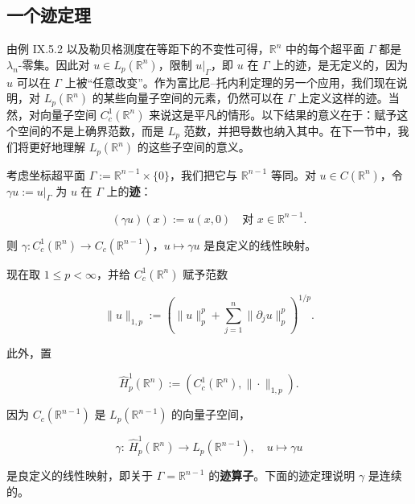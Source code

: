 \subsection*{一个迹定理}

由例 IX.5.2 以及勒贝格测度在等距下的不变性可得，$ \mathbb{R}^{n} $ 中的每个超平面 $ \Gamma $ 都是 $ \lambda_{n} $-零集。因此对 $ u \in L_{p}(\mathbb{R}^{n}) $，限制 $ u|_{\Gamma} $，即 $ u $ 在 $ \Gamma $ 上的迹，是无定义的，因为 $ u $ 可以在 $ \Gamma $ 上被“任意改变”。作为富比尼–托内利定理的另一个应用，我们现在说明，对 $ L_{p}(\mathbb{R}^{n}) $ 的某些向量子空间的元素，仍然可以在 $ \Gamma $ 上定义这样的迹。当然，对向量子空间 $ C_{c}^{1}(\mathbb{R}^{n}) $ 来说这是平凡的情形。以下结果的意义在于：赋予这个空间的不是上确界范数，而是 $ L_{p} $ 范数，并把导数也纳入其中。在下一节中，我们将更好地理解 $ L_{p}(\mathbb{R}^{n}) $ 的这些子空间的意义。

考虑坐标超平面 $ \Gamma := \mathbb{R}^{n-1} \times \{0\} $，我们把它与 $ \mathbb{R}^{n-1} $ 等同。对 $ u \in C(\mathbb{R}^{n}) $，令 $ \gamma u := u|_{\Gamma} $ 为 $ u $ 在 $ \Gamma $ 上的\textbf{迹}：

\[
(\gamma u)(x) := u(x,0) \quad \text{对 } x \in \mathbb{R}^{n-1} .
\]

则 $ \gamma: C_{c}^{1}(\mathbb{R}^{n}) \to C_{c}(\mathbb{R}^{n-1}) $，$ u \mapsto \gamma u $ 是良定义的线性映射。

现在取 $ 1 \le p < \infty $，并给 $ C_{c}^{1}(\mathbb{R}^{n}) $ 赋予范数

\[
\|u\|_{1,p} := \left(\|u\|^{p}_{p}+\sum_{j=1}^{n}\|\partial_{j}u\|^{p}_{p}\right)^{1/p} .
\]

此外，置

\[
\widehat{H}^{1}_{p}(\mathbb{R}^{n}) := \left(C^{1}_{c}(\mathbb{R}^{n}),\|\cdot\|_{1,p}\right) .
\]

因为 $ C_{c}(\mathbb{R}^{n-1}) $ 是 $ L_{p}(\mathbb{R}^{n-1}) $ 的向量子空间，

\[
\gamma:\ \widehat{H}^{1}_{p}(\mathbb{R}^{n}) \to L_{p}(\mathbb{R}^{n-1}) ,\quad u \mapsto \gamma u
\]

是良定义的线性映射，即关于 $ \Gamma = \mathbb{R}^{n-1} $ 的\textbf{迹算子}。下面的迹定理说明 $ \gamma $ 是连续的。

